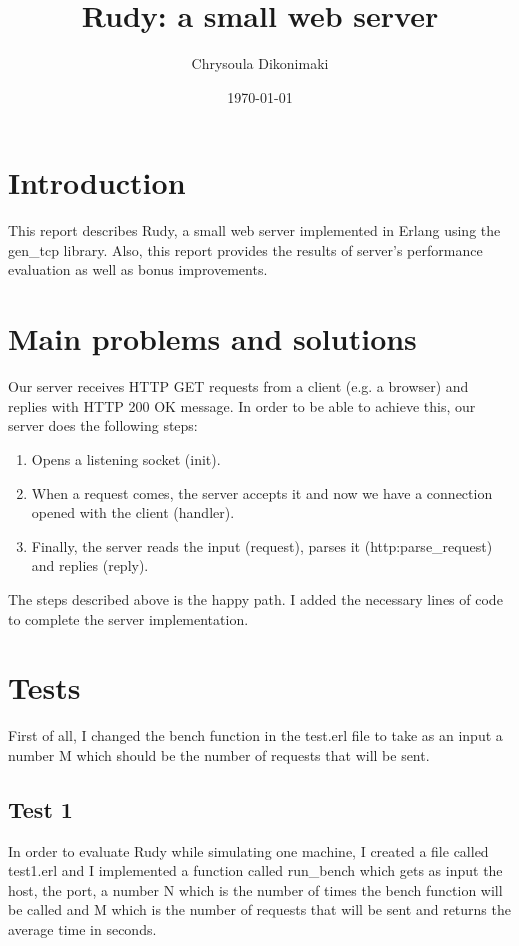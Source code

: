 \documentclass[a4paper, 11pt]{article}
\title{Rudy: a small web server}
\author{Chrysoula Dikonimaki}
\date{\today{}}
\begin{document}
\maketitle

\section{Introduction}

This report describes Rudy, a small web server implemented in Erlang using the gen\_tcp library. Also, this report provides the results of server's performance evaluation as well as bonus improvements.

\section{Main problems and solutions}

Our server receives HTTP GET requests from a client (e.g. a browser) and replies with HTTP 200 OK message. In order to be able to achieve this, our server does the following steps:
\begin{enumerate}
  \item Opens a listening socket (init).
  \item When a request comes, the server accepts it and now we have a connection opened with the client (handler).
  \item Finally, the server reads the input (request), parses it (http:parse\_request) and replies (reply).
\end{enumerate}
The steps described above is the happy path. I added the necessary lines of code to complete the server implementation. 

\section{Tests}
First of all, I changed the bench function in the test.erl file to take as an input a number M which should be the number of requests that will be sent.
\subsection{Test 1}
\label{test1}
In order to evaluate Rudy while simulating one machine, I created a file called test1.erl and I implemented a function called run\_bench which gets as input the host, the port, a number N which is the number of times the bench function will be called and M which is the number of requests that will be sent and returns the average time in seconds. 
\end{document}
